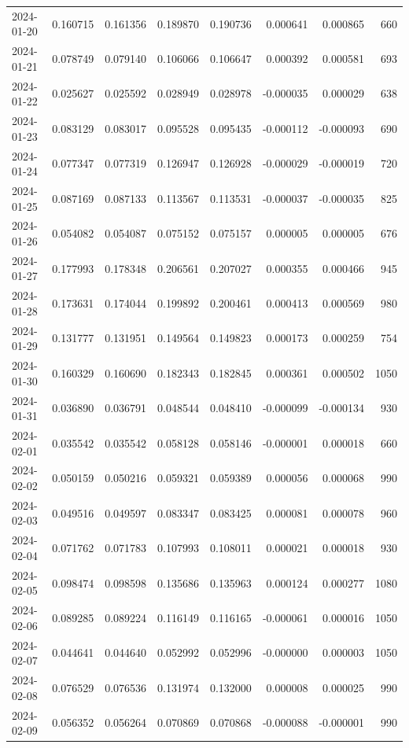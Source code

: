 \begin{tabular}{lrrrrrrr}
2024-01-20 & 0.160715 & 0.161356 & 0.189870 & 0.190736 & 0.000641 & 0.000865 & 660 \\
2024-01-21 & 0.078749 & 0.079140 & 0.106066 & 0.106647 & 0.000392 & 0.000581 & 693 \\
2024-01-22 & 0.025627 & 0.025592 & 0.028949 & 0.028978 & -0.000035 & 0.000029 & 638 \\
2024-01-23 & 0.083129 & 0.083017 & 0.095528 & 0.095435 & -0.000112 & -0.000093 & 690 \\
2024-01-24 & 0.077347 & 0.077319 & 0.126947 & 0.126928 & -0.000029 & -0.000019 & 720 \\
2024-01-25 & 0.087169 & 0.087133 & 0.113567 & 0.113531 & -0.000037 & -0.000035 & 825 \\
2024-01-26 & 0.054082 & 0.054087 & 0.075152 & 0.075157 & 0.000005 & 0.000005 & 676 \\
2024-01-27 & 0.177993 & 0.178348 & 0.206561 & 0.207027 & 0.000355 & 0.000466 & 945 \\
2024-01-28 & 0.173631 & 0.174044 & 0.199892 & 0.200461 & 0.000413 & 0.000569 & 980 \\
2024-01-29 & 0.131777 & 0.131951 & 0.149564 & 0.149823 & 0.000173 & 0.000259 & 754 \\
2024-01-30 & 0.160329 & 0.160690 & 0.182343 & 0.182845 & 0.000361 & 0.000502 & 1050 \\
2024-01-31 & 0.036890 & 0.036791 & 0.048544 & 0.048410 & -0.000099 & -0.000134 & 930 \\
2024-02-01 & 0.035542 & 0.035542 & 0.058128 & 0.058146 & -0.000001 & 0.000018 & 660 \\
2024-02-02 & 0.050159 & 0.050216 & 0.059321 & 0.059389 & 0.000056 & 0.000068 & 990 \\
2024-02-03 & 0.049516 & 0.049597 & 0.083347 & 0.083425 & 0.000081 & 0.000078 & 960 \\
2024-02-04 & 0.071762 & 0.071783 & 0.107993 & 0.108011 & 0.000021 & 0.000018 & 930 \\
2024-02-05 & 0.098474 & 0.098598 & 0.135686 & 0.135963 & 0.000124 & 0.000277 & 1080 \\
2024-02-06 & 0.089285 & 0.089224 & 0.116149 & 0.116165 & -0.000061 & 0.000016 & 1050 \\
2024-02-07 & 0.044641 & 0.044640 & 0.052992 & 0.052996 & -0.000000 & 0.000003 & 1050 \\
2024-02-08 & 0.076529 & 0.076536 & 0.131974 & 0.132000 & 0.000008 & 0.000025 & 990 \\
2024-02-09 & 0.056352 & 0.056264 & 0.070869 & 0.070868 & -0.000088 & -0.000001 & 990 \\

\end{tabular}
